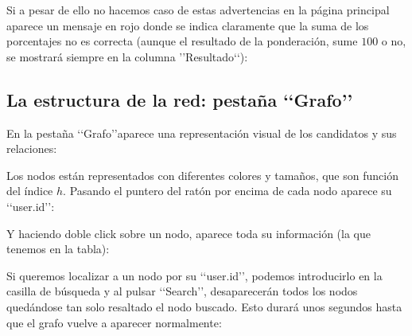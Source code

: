 
Si a pesar de ello no hacemos caso de estas advertencias en la 
página principal aparece un mensaje en rojo donde se indica claramente que la suma 
de los porcentajes no es correcta (aunque el resultado de la ponderación, sume
$100$ o no, se mostrará siempre en la columna \rq\rq  Resultado\lq\lq): 

 


\subsection{La estructura de la red: pestaña \lq\lq Grafo\rq\rq}

En la pestaña \lq\lq Grafo\rq\rq aparece una representación visual de los candidatos 
y sus relaciones:


Los nodos están representados con diferentes colores y tamaños, que son función del 
índice $h$. Pasando el puntero del ratón por encima de cada nodo aparece su 
\lq\lq user.id\rq\rq:


Y haciendo doble click sobre un nodo, aparece toda su información (la que 
tenemos en la tabla):


Si queremos localizar a un nodo por su \lq\lq user.id\rq\rq, podemos introducirlo en la
casilla de búsqueda y al pulsar \lq\lq Search\rq\rq, desaparecerán todos los nodos 
quedándose tan solo resaltado el nodo buscado. 
Esto durará unos segundos hasta que el grafo vuelve a aparecer normalmente:

